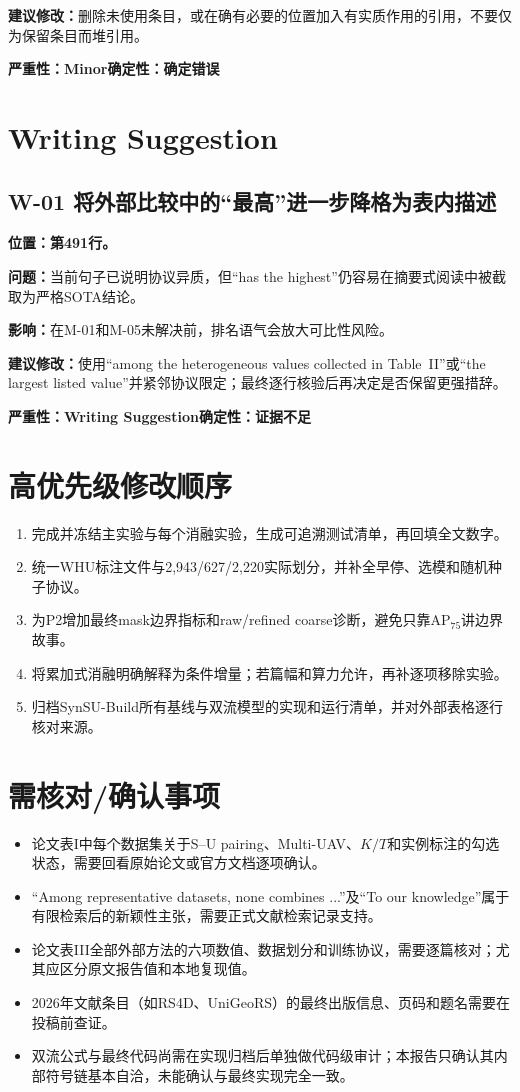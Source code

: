 \documentclass[UTF8,a4paper,11pt]{ctexart}
\newcommand{\sev}[1]{\textbf{严重性：#1}}
\newcommand{\cert}[1]{\textbf{确定性：#1}}
\newcommand{\loc}[1]{\textbf{位置：#1}}
\newcommand{\prob}{\textbf{问题：}}
\newcommand{\impact}{\textbf{影响：}}
\newcommand{\fix}{\textbf{建议修改：}}
\begin{document}
\fix 删除未使用条目，或在确有必要的位置加入有实质作用的引用，不要仅为保留条目而堆引用。

\sev{Minor}\quad \cert{确定错误}

\section*{Writing Suggestion}

\subsection*{W-01 将外部比较中的“最高”进一步降格为表内描述}
\loc{第491行。}

\prob 当前句子已说明协议异质，但“has the highest”仍容易在摘要式阅读中被截取为严格SOTA结论。

\impact 在M-01和M-05未解决前，排名语气会放大可比性风险。

\fix 使用“among the heterogeneous values collected in Table~II”或“the largest listed value”并紧邻协议限定；最终逐行核验后再决定是否保留更强措辞。

\sev{Writing Suggestion}\quad \cert{证据不足}

\section*{高优先级修改顺序}

\begin{enumerate}
  \item 完成并冻结主实验与每个消融实验，生成可追溯测试清单，再回填全文数字。
  \item 统一WHU标注文件与2,943/627/2,220实际划分，并补全早停、选模和随机种子协议。
  \item 为P2增加最终mask边界指标和raw/refined coarse诊断，避免只靠AP$_{75}$讲边界故事。
  \item 将累加式消融明确解释为条件增量；若篇幅和算力允许，再补逐项移除实验。
  \item 归档SynSU-Build所有基线与双流模型的实现和运行清单，并对外部表格逐行核对来源。
\end{enumerate}

\section*{需核对/确认事项}

\begin{itemize}
  \item 论文表I中每个数据集关于S--U pairing、Multi-UAV、$K/T$和实例标注的勾选状态，需要回看原始论文或官方文档逐项确认。
  \item “Among representative datasets, none combines ...”及“To our knowledge”属于有限检索后的新颖性主张，需要正式文献检索记录支持。
  \item 论文表III全部外部方法的六项数值、数据划分和训练协议，需要逐篇核对；尤其应区分原文报告值和本地复现值。
  \item 2026年文献条目（如RS4D、UniGeoRS）的最终出版信息、页码和题名需要在投稿前查证。
  \item 双流公式与最终代码尚需在实现归档后单独做代码级审计；本报告只确认其内部符号链基本自洽，未能确认与最终实现完全一致。
\end{itemize}
\end{document}
